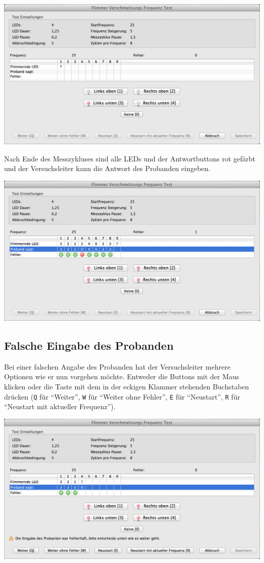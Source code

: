 \documentclass[11pt,accentcolor=tud2a,colorback,noheadingspace]{tudreport}
\begin{document}
\includegraphics[width=\textwidth]{testrunner_running.png}

Nach Ende des Messzykluses sind alle LEDs und der Antwortbuttons rot gefärbt und der Versuchsleiter kann die Antwort des Probanden eingeben.

\includegraphics[width=\textwidth]{testrunner_waiting.png}


\subsection{Falsche Eingabe des Probanden}
\label{tests:falsche-eingabe-des-probanden}
Bei einer falschen Angabe des Probanden hat der Versuchsleiter mehrere Optionen wie er nun vorgehen möchte. Entweder die Buttons mit der Maus klicken oder die Taste mit dem in der eckigen Klammer stehenden Buchstaben drücken (\texttt{Q} für ``Weiter'', \texttt{W} für ``Weiter ohne Fehler'', \texttt{E} für ``Neustart'', \texttt{R} für ``Neustart mit aktueller Frequenz'').

\includegraphics[width=\textwidth]{testrunner_wronganswer.png}
\end{document}
